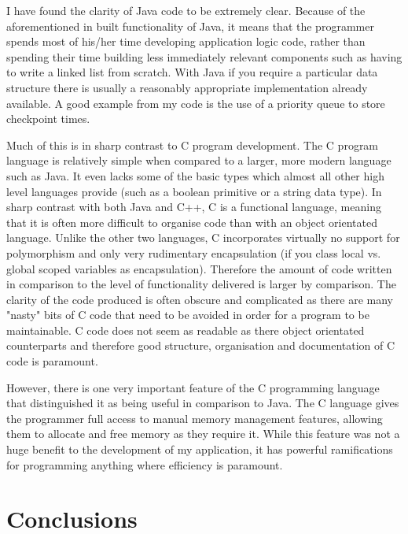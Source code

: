 \documentclass{article}
\begin{document}
I have found the clarity of Java code to be extremely clear. Because of the aforementioned in built functionality of Java, it means that the programmer spends most of his/her time developing application logic code, rather than spending their time building less immediately relevant components such as having to write a linked list from scratch. With Java if you require a particular data structure there is usually a reasonably appropriate implementation already available. A good example from my code is the use of a priority queue to store checkpoint times.

Much of this is in sharp contrast to C program development. The C program language is relatively simple when compared to a larger, more modern language such as Java. It even lacks some of the basic types which almost all other high level languages provide (such as a boolean primitive or a string data type). In sharp contrast with both Java and C++, C is a functional language, meaning that it is often more difficult to organise code than with an object orientated language. Unlike the other two languages, C incorporates virtually no support for polymorphism and only very rudimentary encapsulation (if you class local vs. global scoped variables as encapsulation). Therefore the amount of code written in comparison to the level of functionality delivered is larger by comparison. The clarity of the code produced is often obscure and complicated as there are many "nasty" bits of C code that need to be avoided in order for a program to be maintainable. C code does not seem as readable as there object orientated counterparts and therefore good structure, organisation and documentation of C code is paramount.

However, there is one very important feature of the C programming language that distinguished it as being useful in comparison to Java. The C language gives the programmer full access to manual memory management features, allowing them to allocate and free memory as they require it. While this feature was not a huge benefit to the development of my application, it has powerful ramifications for programming anything where efficiency is paramount.

\section{Conclusions}
\end{document}
